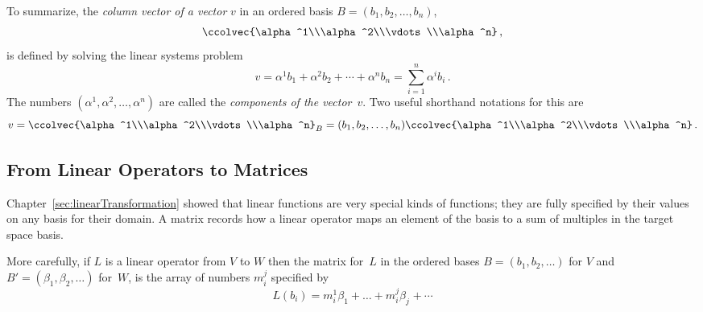 To summarize, the {\itshape column vector 
of a vector} $v$ in an ordered basis $B=(b_1,b_2,\ldots,b_n)$,
\[\ccolvec{\alpha^1\\\alpha^2\\\vdots\\\alpha^n}\, ,\] is defined by solving the linear systems problem
\[
v=\alpha^1 b_1 + \alpha^2b_2 +\cdots + \alpha^n b_n = \sum_{i=1}^n \alpha^i b_i\, .
\]
The numbers $(\alpha^1,\alpha^2,\ldots,\alpha^n)$ are called the {\itshape components of the vector}~$v$.
Two useful shorthand notations for this are
\[
v=\ccolvec{\alpha^1\\\alpha^2\\\vdots\\\alpha^n}_B = (b_1,b_2,\ldots,b_n)\ccolvec{\alpha^1\\\alpha^2\\\vdots\\\alpha^n}\, .
\]

\subsection{From Linear Operators to Matrices}

Chapter~\ref{sec:linearTransformation} showed that linear functions are very special kinds of functions; 
they are fully specified by their values on any basis for their domain. 
A matrix  records how a linear operator maps an element of the basis to a sum of multiples in the target space basis.

More carefully, if $L$ is a linear operator from $V$ to $W$ 
then the matrix for~$L$ in the ordered bases $B=(b_1,b_2,\dots)$ for $V$ and $B'=(\beta_1,\beta_2,\dots)$ for~$W$, is the
 array of numbers %
%
 $m_{i}^j$ specified by 
\[L(b_i)= m_{i}^1\beta_1^{\phantom{1}}+\dots +m_{i}^j \beta_j^{\phantom{1}}+\cdots\]

